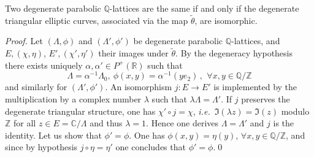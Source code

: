 \documentclass[graybox, envcountsect%
]{svmult}
\def\C{{\mathbb C}}
\def\Q{{\mathbb Q}}
\def\R{{\mathbb R}}
\def\Z{{\mathbb Z}}
\def\qqq{\,,\,~\forall}
\newcommand{\ie}{{\it i.e.\/}\ }
\begin{document}
\begin{proposition}\label{degeneratetr1}  Two degenerate parabolic $\Q$-lattices are the same if and only if the  degenerate triangular elliptic curves, associated via the map $\tilde \theta$,  are isomorphic. 	
\end{proposition}
\begin{proof} Let $(\Lambda,\phi)$ and $(\Lambda',\phi')$ be degenerate parabolic $\Q$-lattices, and $E,(\chi,\eta)$, $E',(\chi',\eta')$ their images under $\tilde \theta$. By the  degeneracy hypothesis there exists uniquely $\alpha,\alpha'\in P^+(\R)$ such that 
$$
\Lambda=\alpha^{-1}\Lambda_0,\ \phi(x,y)=\alpha^{-1}(ye_2) \qqq x,y\in \Q/\Z
$$
and similarly for $(\Lambda',\phi')$. An isomorphism $j:E\to E'$ is implemented by the multiplication by a complex number $\lambda$ such that $\lambda\Lambda=\Lambda'$. 
  If $j$ preserves the degenerate triangular structure, one has $\chi'\circ j=\chi$, \ie $\Im (\lambda z)=\Im(z)$ modulo $\Z$ for all $z\in E=\C/\Lambda$ and thus $\lambda =1$. Hence one derives $\Lambda=\Lambda'$ and $j$ is the identity. Let us show that $\phi'=\phi$. One has $\phi(x,y)=\eta(y)$, $\forall x,y\in \Q/\Z$, and since by hypothesis $j\circ \eta=\eta'$ one concludes that $\phi'=\phi$.\qed \end{proof} 
\end{document}
